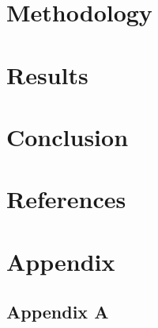 \documentclass[preprint, authoryear]{article}
\numberwithin{equation}{section}
\numberwithin{figure}{section}
\numberwithin{table}{section}
\begin{document}
\hypertarget{methodology}{%
\section{\texorpdfstring{Methodology
\label{Meth}}{Methodology }}\label{methodology}}

\hypertarget{results}{%
\section{Results}\label{results}}

\hypertarget{conclusion}{%
\section{Conclusion}\label{conclusion}}

\newpage

\hypertarget{references}{%
\section*{References}\label{references}}

\hypertarget{refs}{}

\hypertarget{appendix}{%
\section*{Appendix}\label{appendix}}

\hypertarget{appendix-a}{%
\subsection*{Appendix A}\label{appendix-a}}


\end{document}
